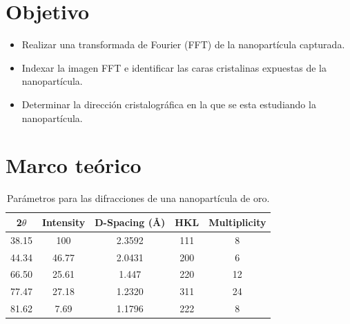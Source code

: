 \documentclass[reprint,amsmath,amssymb,aps,]{revtex4-2}
\begin{document}
\section{Objetivo}
\begin{itemize}
    \item Realizar una transformada de Fourier (FFT) de la nanopartícula capturada.
    \item Indexar la imagen FFT e identificar las caras cristalinas expuestas de la nanopartícula.
    \item Determinar la dirección cristalográfica en la que se esta estudiando la nanopartícula.
\end{itemize}
\section{Marco teórico}
\begin{table}[H]
    \centering
    \begin{tabular}{ccccc}\hline
        2$\theta$ & Intensity & D-Spacing (\r{A}) & HKL & Multiplicity\\ \hline
        38.15 & 100 & 2.3592 & 111 & 8 \\
        44.34 & 46.77 & 2.0431 & 200 & 6 \\
        66.50 & 25.61 & 1.447 & 220 & 12 \\
        77.47 & 27.18 & 1.2320 & 311 & 24 \\
        81.62 & 7.69 & 1.1796 & 222 & 8 \\ \hline
    \end{tabular}
    \caption{Parámetros para las difracciones de una nanopartícula de oro.}
    \label{tabla:parametros}
\end{table}
\end{document}
